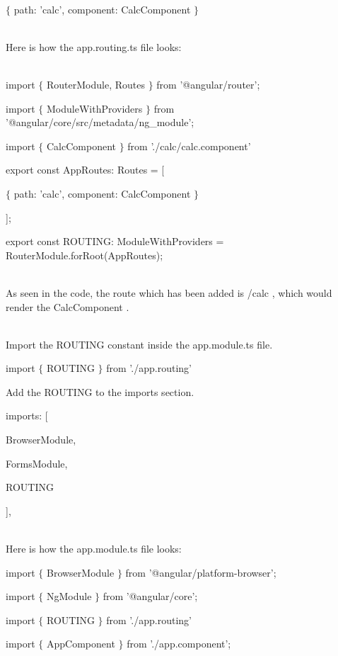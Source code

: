 \documentclass{article}
\begin{document}
\noindent \\ $\mathrm{\{}$ path: 'calc', component: CalcComponent $\mathrm{\}}$ 

\noindent \\ Here is how the app.routing.ts file looks:

\noindent \\ import $\mathrm{\{}$ RouterModule, Routes $\mathrm{\}}$ from '@angular/router'; 

\noindent import $\mathrm{\{}$ ModuleWithProviders $\mathrm{\}}$ from '@angular/core/src/metadata/ng\_module';

\noindent import $\mathrm{\{}$ CalcComponent $\mathrm{\}}$ from './calc/calc.component'

\noindent export const AppRoutes: Routes = [

\noindent $\mathrm{\{}$ path: 'calc', component: CalcComponent $\mathrm{\}}$

\noindent ];

\noindent 

\noindent export const ROUTING: ModuleWithProviders = RouterModule.forRoot(AppRoutes);

\noindent \\ As seen in the code, the route which has been added is /calc , which would render the CalcComponent .

\noindent \\ Import the ROUTING constant inside the app.module.ts file.

\noindent import $\mathrm{\{}$ ROUTING $\mathrm{\}}$ from './app.routing'

\noindent Add the ROUTING to the imports section.

\noindent imports: [ 

\noindent BrowserModule, 

\noindent FormsModule, 

\noindent ROUTING

\noindent ],

\noindent \\ Here is how the app.module.ts file looks:

\noindent import $\mathrm{\{}$ BrowserModule $\mathrm{\}}$ from '@angular/platform-browser'; 

\noindent import $\mathrm{\{}$ NgModule $\mathrm{\}}$ from '@angular/core';

\noindent import $\mathrm{\{}$ ROUTING $\mathrm{\}}$ from './app.routing'

\noindent import $\mathrm{\{}$ AppComponent $\mathrm{\}}$ from './app.component'; 
\end{document}
